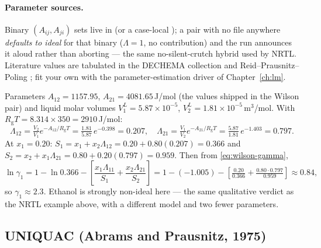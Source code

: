 \documentclass[11pt,a4paper]{article}
\newcommand{\Rgas}{R_{\!\mathrm{g}}}                %
\begin{document}
\paragraph{Parameter sources.} Binary $(A_{ij},A_{ji})$ sets live in
 (or a case-local
); a pair with no file anywhere
\emph{defaults to ideal} for that binary ($\Lambda=1$, no contribution)
and the run announces it aloud rather than aborting --- the same
no-silent-crutch hybrid used by NRTL. Literature values are tabulated in
the DECHEMA collection and Reid--Prausnitz--Poling \cite{RPP}; fit your
own with the parameter-estimation driver of Chapter~\ref{ch:lm}.

\begin{example}[Wilson $\gamma$ for ethanol(1)/water(2) at 350\,K, $x_1=0.20$]
Parameters $A_{12}=1157.95$, $A_{21}=4081.65$\,J/mol (the values shipped
in the  Wilson pair) and liquid molar volumes
$V_1^L=5.87\times10^{-5}$, $V_2^L=1.81\times10^{-5}$\,m$^3$/mol. With
$\Rgas T = 8.314\times350 = 2910$\,J/mol:
\[
   \Lambda_{12}=\tfrac{V_2}{V_1}e^{-A_{12}/\Rgas T}
              =\tfrac{1.81}{5.87}\,e^{-0.398}=0.207,\quad
   \Lambda_{21}=\tfrac{V_1}{V_2}e^{-A_{21}/\Rgas T}
              =\tfrac{5.87}{1.81}\,e^{-1.403}=0.797 .
\]
At $x_1=0.20$: $S_1=x_1+x_2\Lambda_{12}=0.20+0.80(0.207)=0.366$ and
$S_2=x_2+x_1\Lambda_{21}=0.80+0.20(0.797)=0.959$. Then from
\eqref{eq:wilson-gamma},
\[
   \ln\gamma_1 = 1 - \ln 0.366
     - \!\left[\frac{x_1\Lambda_{11}}{S_1}+\frac{x_2\Lambda_{21}}{S_2}\right]
   = 1 - (-1.005) - \!\left[\tfrac{0.20}{0.366}+\tfrac{0.80\cdot0.797}{0.959}\right]
   \approx 0.84,
\]
so $\gamma_1\approx2.3$. Ethanol is strongly non-ideal here --- the same
qualitative verdict as the NRTL example above, with a different model and
two fewer parameters.
\end{example}

\subsection{UNIQUAC (Abrams and Prausnitz, 1975)}\label{sec:uniquac}
\end{document}
